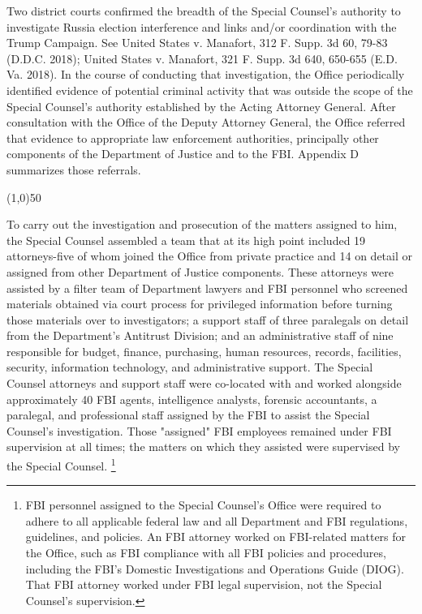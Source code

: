 \documentclass{article}
\newcommand{\hr}{\begin{center} \line(1,0){50} \end{center}}
\begin{document}
Two district courts confirmed the breadth of the Special Counsel's authority to investigate Russia election interference and links and/or coordination with the Trump Campaign.
See United States v. Manafort, 312 F. Supp. 3d 60, 79-83 (D.D.C. 2018); United States v. Manafort, 321 F. Supp. 3d 640, 650-655 (E.D. Va. 2018).
In the course of conducting that investigation, the Office periodically identified evidence of potential criminal activity that was outside the scope of the Special Counsel's authority established by the Acting Attorney General.
After consultation with the Office of the Deputy Attorney General, the Office referred that evidence to appropriate law enforcement authorities, principally other components of the Department of Justice and to the FBI.
Appendix D summarizes those referrals.

\hr

To carry out the investigation and prosecution of the matters assigned to him, the Special Counsel assembled a team that at its high point included 19 attorneys-five of whom joined the Office from private practice and 14 on detail or assigned from other Department of Justice components.
These attorneys were assisted by a filter team of Department lawyers and FBI personnel who screened materials obtained via court process for privileged information before turning those materials over to investigators; a support staff of three paralegals on detail from the Department's Antitrust Division; and an administrative staff of nine responsible for budget, finance, purchasing, human resources, records, facilities, security, information technology, and administrative support.
The Special Counsel attorneys and support staff were co-located with and worked alongside approximately 40 FBI agents, intelligence analysts, forensic accountants, a paralegal, and professional staff assigned by the FBI to assist the Special Counsel's investigation.
Those "assigned" FBI employees remained under FBI supervision at all times; the matters on which they assisted were supervised by the Special Counsel.
\footnote{FBI personnel assigned to the Special Counsel's Office were required to adhere to all applicable federal law and all Department and FBI regulations, guidelines, and policies.
An FBI attorney worked on FBI-related matters for the Office, such as FBI compliance with all FBI policies and procedures, including the FBI's Domestic Investigations and Operations Guide (DIOG).
That FBI attorney worked under FBI legal supervision, not the Special Counsel's supervision.}
\end{document}
